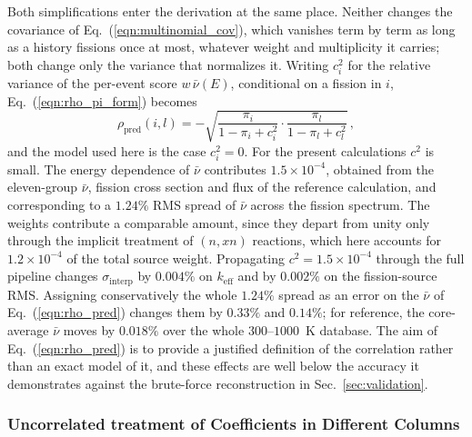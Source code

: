 \documentclass{style/nseJournal}
\begin{document}
Both simplifications enter the derivation at the same place. Neither changes the covariance of Eq.~(\ref{eqn:multinomial_cov}), which vanishes term by term as long as a history fissions once at most, whatever weight and multiplicity it carries; both change only the variance that normalizes it. Writing $c_i^2$ for the relative variance of the per-event score $w\,\bar\nu(E)$, conditional on a fission in $i$, Eq.~(\ref{eqn:rho_pi_form}) becomes
\begin{equation}
  \rho_{\text{pred}}(i,l) = -\sqrt{\frac{\pi_i}{1-\pi_i+c_i^2}\cdot\frac{\pi_l}{1-\pi_l+c_l^2}}\,,
  \label{eqn:rho_pred_nu}
\end{equation}
and the model used here is the case $c_i^2=0$. For the present calculations $c^2$ is small. The energy dependence of $\bar\nu$ contributes $1.5\times10^{-4}$, obtained from the eleven-group $\bar\nu$, fission cross section and flux of the reference calculation, and corresponding to a $1.24\%$ RMS spread of $\bar\nu$ across the fission spectrum. The weights contribute a comparable amount, since they depart from unity only through the implicit treatment of $(n,xn)$ reactions, which here accounts for $1.2\times10^{-4}$ of the total source weight. Propagating $c^2=1.5\times10^{-4}$ through the full pipeline changes $\sigma_{\text{interp}}$ by $0.004\%$ on $k_{\text{eff}}$ and by $0.002\%$ on the fission-source RMS. Assigning conservatively the whole $1.24\%$ spread as an error on the $\bar\nu$ of Eq.~(\ref{eqn:rho_pred}) changes them by $0.33\%$ and $0.14\%$; for reference, the core-average $\bar\nu$ moves by $0.018\%$ over the whole $300$--$1000$~K database. The aim of Eq.~(\ref{eqn:rho_pred}) is to provide a justified definition of the correlation rather than an exact model of it, and these effects are well below the accuracy it demonstrates against the brute-force reconstruction in Sec.~\ref{sec:validation}.

\subsubsection{Uncorrelated treatment of Coefficients in Different Columns}
\label{sec:cross_column}
\end{document}
